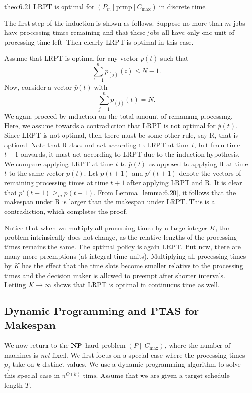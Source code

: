 \begin{theo}{theo:6.21}
    LRPT is optimal for $(P_m~|~\text{prmp}~|~C_{\max})$ in discrete time. 
\end{theo}
\begin{pf}
    The first step of the induction is shown as follows. Suppose no more than
    $m$ jobs have processing times remaining and that these jobs all have only 
    one unit of processing time left. Then clearly LRPT is optimal in this case.

    Assume that LRPT is optimal for any vector $\overline p(t)$ such that 
    \[ \sum_{j=1}^n p_{(j)}(t) \leq N-1. \] 
    Now, consider a vector $\overline p(t)$ with 
    \[ \sum_{j=1}^n p_{(j)}(t) = N. \] 
    We again proceed by induction on the total amount of remaining processing.
    Here, we assume towards a contradiction that LRPT is not optimal 
    for $\overline p(t)$. Since LRPT is not optimal, then there must be 
    some other rule, say R, that is optimal. Note that R does not act according to 
    LRPT at time $t$, but from time $t + 1$ onwards, it must act according to 
    LRPT due to the induction hypothesis. We compare applying LRPT at time 
    $t$ to $\overline p(t)$ as opposed to applying R at time $t$ to 
    the same vector $\overline p(t)$. Let $\overline p(t+1)$ and 
    $\overline p'(t+1)$ denote the vectors of remaining processing times 
    at time $t+1$ after applying LRPT and R. It is clear that 
    $\overline p'(t+1) \geq_m \overline p(t+1)$. From Lemma~\ref{lemma:6.20}, 
    it follows that the makespan under R is larger than the makespan under 
    LRPT. This is a contradiction, which completes the proof. 
\end{pf}

Notice that when we multiply all processing times by a large integer $K$,
the problem intrinsically does not change, as the relative lengths of the 
processing times remains the same. The optimal policy is again LRPT. But now, 
there are many more preemptions (at integral time units). Multiplying all 
processing times by $K$ has the effect that the time slots become smaller 
relative to the processing times and the decision maker is allowed to preempt 
after shorter intervals. Letting $K \to \infty$ shows that LRPT is optimal in 
continuous time as well. 

\subsection{Dynamic Programming and PTAS for Makespan} \label{subsec:6.3}
We now return to the $\operatorname{\textbf{NP}}$-hard problem $(P~||~C_{\max})$, where the 
number of machines is \emph{not} fixed. We first focus on a special 
case where the processing times $p_j$ take on $k$ distinct values. We use a
dynamic programming algorithm to solve this special case in $n^{O(k)}$ time. 
Assume that we are given a target schedule length $T$.

